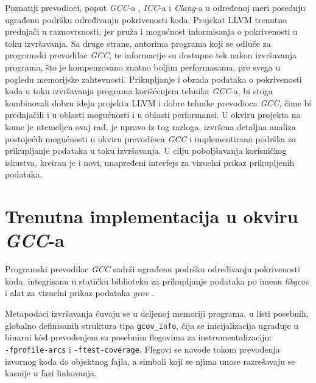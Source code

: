 \documentclass[12pt,oneside]{memoir}
\newcommand{\kod}[1]{\texttt{#1}}
\newcommand{\strano}[1]{\textit{#1}}
\begin{document}
Poznatiji prevodioci, poput \strano{GCC}-a \cite{GCC}, \strano{ICC}-a \cite{ICC} i \strano{Clang}-a \cite{CLANG} u određenoj meri poseduju ugrađenu podršku određivanju pokrivenosti koda. Projekat LLVM trenutno prednjači u raznovrsnosti, jer pruža i mogućnost informisanja o pokrivenosti u toku izvršavanja. Sa druge strane, autorima programa koji se odluče za programski prevodilac \strano{GCC}, te informacije su dostupne tek nakon izvršavanja programa, što je kompenzovano znatno boljim performasama, pre svega u pogledu memorijske zahtevnosti. Prikupljanje i obrada podataka o pokrivenosti koda u toku izvršavanja programa korišćenjem tehnika \strano{GCC}-a, bi stoga kombinovali dobru ideju projekta LLVM i dobre tehnike prevodioca \strano{GCC}, čime bi prednjačili i u oblasti mogućnosti i u oblasti performansi. U okviru projekta na kome je utemeljen ovaj rad, je upravo iz tog razloga, izvršena detaljna analiza postojećih mogućnosti u okviru prevodioca \strano{GCC} i implementirana podrška za prikupljanje podataka u toku izvršavanja. U cilju poboljšavanja korisničkog iskustva, kreiran je i novi, unapređeni interfejs za vizuelni prikaz prikupljenih podataka.

\section{Trenutna implementacija u okviru \strano{GCC}-a}


Programski prevodilac \strano{GCC} sadrži ugrađenu podršku određivanju pokrivenosti koda, integrisanu u statičku biblioteku za prikupljanje podataka po imenu \strano{libgcov} i alat za vizuelni prikaz podataka \strano{gcov} \cite{GCOV, CodeCoverage}. 

Metapodaci izvršavanja čuvaju se u deljenoj memoriji programa, u listi posebnih, globalno definisanih struktura tipa \kod{gcov\_info}, čija se inicijalizacija ugrađuje u binarni k\^{o}d prevođenjem sa posebnim flegovima za instrumentalizaciju: \\  
\kod{-fprofile-arcs} i \kod{-ftest-coverage}. Flegovi se navode tokom prevođenja izvornog koda do objektnog fajla, a simboli koji se njima unose razrešavaju se kasnije u fazi linkovanja.  
\end{document}
